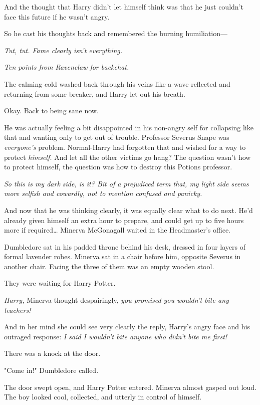 And the thought that Harry didn't let himself think was that he just couldn't 
face this future if he wasn't angry.

So he cast his thoughts back and remembered the burning humiliation---

\emph{Tut, tut. Fame clearly isn't everything.}

\emph{Ten points from Ravenclaw for backchat.}

The calming cold washed back through his veins like a wave reflected and 
returning from some breaker, and Harry let out his breath.

Okay. Back to being sane now.

He was actually feeling a bit disappointed in his non-angry self for collapsing 
like that and wanting only to get out of trouble. Professor Severus Snape was 
\emph{everyone's} problem. Normal-Harry had forgotten that and wished for a way 
to protect \emph{himself.} And let all the other victims go hang? The question 
wasn't how to protect himself, the question was how to destroy this Potions 
professor.

\emph{So this is my dark side, is it? Bit of a prejudiced term that, my light 
side seems more selfish and cowardly, not to mention confused and panicky.}

And now that he was thinking clearly, it was equally clear what to do next. 
He'd already given himself an extra hour to prepare, and could get up to five 
hours more if required{\ldots}
\sbreak
Minerva McGonagall waited in the Headmaster's office.

Dumbledore sat in his padded throne behind his desk, dressed in four layers of 
formal lavender robes. Minerva sat in a chair before him, opposite Severus in 
another chair. Facing the three of them was an empty wooden stool.

They were waiting for Harry Potter.

\emph{Harry,} Minerva thought despairingly, \emph{you promised you wouldn't 
bite any teachers!}

And in her mind she could see very clearly the reply, Harry's angry face and 
his outraged response: \emph{I said I wouldn't bite anyone who didn't bite me 
first!}

There was a knock at the door.

"Come in!" Dumbledore called.

The door swept open, and Harry Potter entered. Minerva almost gasped out loud. 
The boy looked cool, collected, and utterly in control of himself.

